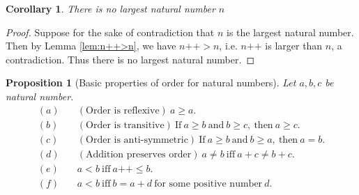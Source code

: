 \documentclass[a4paper,oneside]{book}
\newtheorem*{proof}{\textit{Proof.}}
\newtheorem{corollary}{Corollary}[section]
\newtheorem{proposition}{Proposition}[section]
\begin{document}
			\begin{corollary}
				There is no largest natural number $n$
			\end{corollary}
			\begin{proof}
				Suppose for the sake of contradiction that $n$ is the largest natural number. Then by Lemma \ref{lem:n++>n}, we have $n\texttt{++}>n$, i.e. $n\texttt{++}$ is larger than $n$, a contradiction. Thus there is no largest natural number.
			\end{proof}
			\begin{proposition}[Basic properties of order for natural numbers]
				\label{pro:NaturalNumberOrder}
				Let $a,b,c$ be natural number.
				\begin{align*}
					(a) &\quad(\textrm{Order is reflexive})~a \geq a.\\
					(b) &\quad(\textrm{Order is transitive})~\textrm{If}~a \geq b ~\textrm{and}~b \geq c,~\mathrm{then}~a \geq c.\\
					(c) &\quad(\textrm{Order is anti-symmetric})~\textrm{If}~a \geq b~\textrm{and}~b \geq a,~\textrm{then}~a=b.\\
					(d) &\quad(\textrm{Addition preserves order})~a \neq b ~\textrm{iff}~a+c \neq b+c.\\
					(e) &\quad a<b~\textrm{iff}~a\texttt{++}\leq b.\\
					(f) &\quad a<b~\textrm{iff}~b=a+d~\textrm{for some positive number}~d.
				\end{align*}
			\end{proposition}
\end{document}

